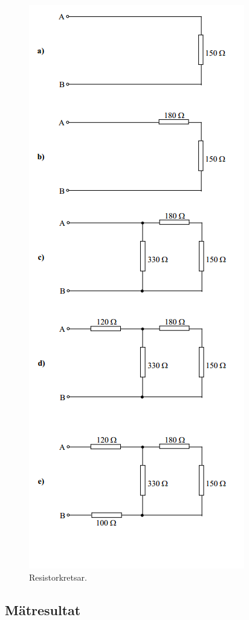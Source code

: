 \documentclass[11pt,a4paper]{article}
\begin{document}
\begin{figure}[htbp]
    \centering
        \includegraphics[scale=0.9]{misc/krets4.png}
    \caption{Resistorkretsar.}
    \label{fig:4-mm-schem}
\end{figure}

\subsection{Mätresultat}\label{}
\end{document}
